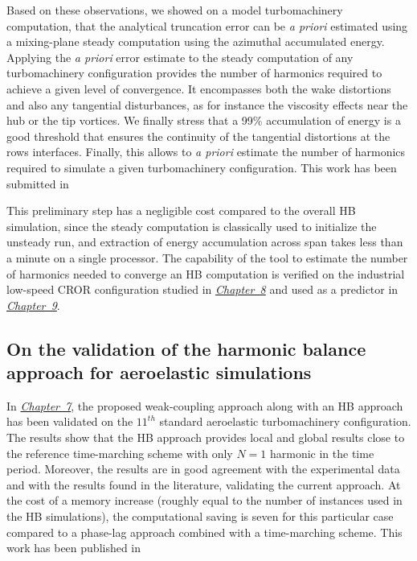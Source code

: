 Based on these observations,
we showed on a model turbomachinery computation, that
the analytical truncation error can be \emph{a priori} 
estimated using a mixing-plane steady computation
using the azimuthal accumulated energy.
Applying the \emph{a priori} error estimate to 
the steady computation of any turbomachinery configuration
provides the number of harmonics required 
to achieve a given level of convergence.
It encompasses both the wake distortions and also
any tangential disturbances, as for instance
the viscosity effects near the hub or the tip vortices.
We finally stress that a  99\% accumulation of energy
is a good threshold
that ensures the continuity of the tangential distortions at the rows
interfaces. Finally, this allows to \emph{a priori}
estimate the number of harmonics required to simulate
a given turbomachinery configuration.
This work has been submitted in
\begin{quote}
\end{quote}

This preliminary step has a negligible cost compared to the overall HB
simulation, since the steady computation is classically used to initialize 
the unsteady run, and extraction of energy accumulation across span takes 
less than a minute on a single processor. The capability of the
tool to estimate the number of harmonics needed
to converge an HB computation is verified on the industrial low-speed CROR configuration
studied in \hyperref[cha:dream_ls_isolated]{\emph{Chapter~8}}
and used as a predictor in \hyperref[cha:dream_hs_isolated]{\emph{Chapter~9}}.

\subsection*{On the validation of the harmonic balance approach for aeroelastic simulations}

In \hyperref[cha:stcf11]{\emph{Chapter~7}}, 
the proposed weak-coupling approach along with
an HB approach has been
validated on the $11^{th}$ standard aeroelastic turbomachinery
configuration.
The results show that the HB approach provides local
and global results close to the reference time-marching scheme 
with only $N=1$ harmonic in the time period. 
Moreover, the results are
in good agreement with the experimental data and with the results
found in the literature, validating the current approach.
At the cost of a memory
increase (roughly equal to the number of instances used in the HB
simulations), the computational saving is seven for this
particular case compared to a phase-lag approach combined
with a time-marching scheme. 
This work has been published in
\begin{quote}
\end{quote}

